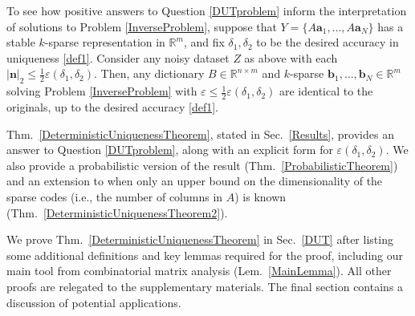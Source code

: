 \documentclass[journal, twocolumn]{IEEEtran}
\begin{document}
To see how positive answers to Question \ref{DUTproblem} inform the interpretation of solutions to Problem \ref{InverseProblem}, suppose that \mbox{$Y = \{A \mathbf{a}_1, \ldots, A\mathbf{a}_N\}$} has a stable $k$-sparse representation in $\mathbb R^m$, and fix $\delta_1, \delta_2$ to be the desired accuracy in uniqueness \eqref{def1}.  Consider any noisy dataset $Z$ as above with each $|\mathbf{n}|_2 \leq \frac{1}{2} \varepsilon(\delta_1, \delta_2)$.  Then, any  dictionary $B \in \mathbb{R}^{n \times m}$ and $k$-sparse $\mathbf{b}_1, \ldots, \mathbf{b}_N \in \mathbb{R}^m$ solving Problem \ref{InverseProblem} with $\varepsilon \leq \frac{1}{2} \varepsilon(\delta_1, \delta_2)$ are identical to the originals, up to the desired accuracy \eqref{def1}.
%
%
%
%

Thm.~\ref{DeterministicUniquenessTheorem}, stated in Sec.~\ref{Results}, provides an answer to Question \ref{DUTproblem}, along with an explicit form for $\varepsilon(\delta_1, \delta_2)$.  We also provide a probabilistic version of the result (Thm.~\ref{ProbabilisticTheorem}) and an extension to when only an upper bound on the dimensionality of the sparse codes (i.e., the number of columns in $A$) is known (Thm.~\ref{DeterministicUniquenessTheorem2}). 

We prove Thm.~\ref{DeterministicUniquenessTheorem} in Sec.~\ref{DUT} after listing some additional definitions and key lemmas required for the proof, including our main tool from combinatorial matrix analysis (Lem.~\ref{MainLemma}). All other proofs are relegated to the supplementary materials. The final section contains a discussion of potential applications.
\end{document}
